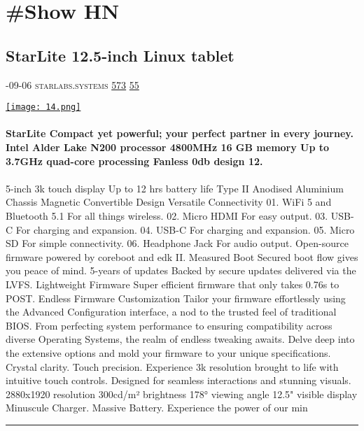 \documentclass[10pt,a4paper]{article}
\begin{document}
\newpage
\section{\#Show HN}

\begin{multicols*}{2}

\noindent\begin{minipage}{\linewidth}
\subsection{StarLite 12.5-inch Linux tablet}
\textsc{\footnotesize
{\scriptsize\faCalendar}-09-06 
{\scriptsize\faGlobe}\space 
starlabs.systems 
{\scriptsize\faThumbsOUp}\space 
\href{http://news.ycombinator.com/item?id=37169696\&utm\_term=comment}{573} 
{\scriptsize\faComments}\space 
\href{http://news.ycombinator.com/item?id=37169696\&utm\_term=comment}{55} 
}
\par\medskip\noindent
\href{https://us.starlabs.systems/pages/starlite?utm\_source=hackernewsletter\&utm\_medium=email\&utm\_term=show\_hn}{
    \texttt{[image: 14.png]}
}
\end{minipage}
\paragraph{}
\textbf{StarLite
Compact yet powerful; your perfect partner in every journey.
Intel Alder Lake
N200
processor
4800MHz
16 GB
memory
Up to
3.7GHz
quad-core processing
Fanless
0db
design
12.}
\paragraph{}
5-inch
3k
touch display
Up to
12 hrs
battery life
Type II Anodised
Aluminium
Chassis
Magnetic
Convertible
Design
Versatile Connectivity
01.
WiFi 5 and Bluetooth 5.1
For all things wireless.
02.
Micro HDMI
For easy output.
03.
USB-C
For charging and expansion.
04.
USB-C
For charging and expansion.
05.
Micro SD
For simple connectivity.
06.
Headphone Jack
For audio output.
Open-source firmware
powered by
coreboot
and
edk II.
Measured Boot
Secured boot flow gives you peace of mind.
5-years of updates
Backed by secure updates delivered via the LVFS.
Lightweight Firmware
Super efficient firmware that only takes 0.76s to POST.
Endless Firmware Customization
Tailor your firmware effortlessly using the Advanced Configuration interface, a nod to the trusted feel of
traditional BIOS.
From perfecting system performance to ensuring compatibility across diverse Operating Systems, the realm of endless tweaking awaits. Delve deep into the extensive options and mold your firmware to your unique specifications.
Crystal clarity. Touch precision.
Experience 3k resolution brought to life with intuitive touch controls. Designed for seamless interactions and stunning visuals.
2880x1920
resolution
300cd/m²
brightness
178°
viewing angle
12.5"
visible display
Minuscule Charger.
Massive Battery.
Experience the power of our min
\par\noindent\textcolor{red}{\rule{\linewidth}{0.2mm}}
\vfill
\null
\noindent\begin{minipage}{\linewidth}

\end{minipage}
\end{multicols*}
\end{document}
